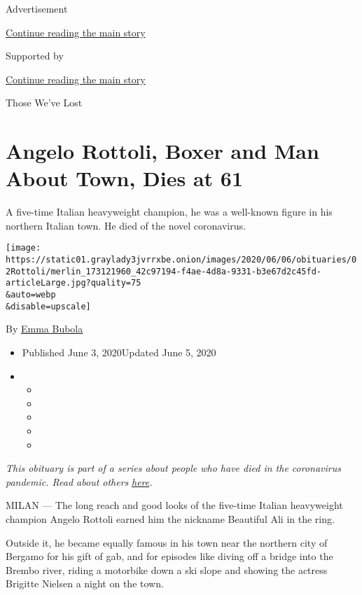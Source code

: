 Advertisement

\protect\hyperlink{after-top}{Continue reading the main story}

Supported by

\protect\hyperlink{after-sponsor}{Continue reading the main story}

Those We've Lost

\hypertarget{angelo-rottoli-boxer-and-man-about-town-dies-at-61}{%
\section{Angelo Rottoli, Boxer and Man About Town, Dies at
61}\label{angelo-rottoli-boxer-and-man-about-town-dies-at-61}}

A five-time Italian heavyweight champion, he was a well-known figure in
his northern Italian town. He died of the novel coronavirus.

\texttt{[image: https://static01.graylady3jvrrxbe.onion/images/2020/06/06/obituaries/02Rottoli/merlin\_173121960\_42c97194-f4ae-4d8a-9331-b3e67d2c45fd-articleLarge.jpg?quality=75\\\&auto=webp\\\&disable=upscale]}

By \href{https://www.nytimes3xbfgragh.onion/by/emma-bubola}{Emma Bubola}

\begin{itemize}
\item
  Published June 3, 2020Updated June 5, 2020
\item
  \begin{itemize}
  \item
  \item
  \item
  \item
  \item
  \end{itemize}
\end{itemize}

\emph{This obituary is part of a series about people who have died in
the coronavirus pandemic. Read about others}
\href{https://www.nytimes3xbfgragh.onion/interactive/2020/obituaries/people-died-coronavirus-obituaries.html}{\emph{here}}\emph{.}

MILAN --- The long reach and good looks of the five-time Italian
heavyweight champion Angelo Rottoli earned him the nickname Beautiful
Ali in the ring.

Outside it, he became equally famous in his town near the northern city
of Bergamo for his gift of gab, and for episodes like diving off a
bridge into the Brembo river, riding a motorbike down a ski slope and
showing the actress Brigitte Nielsen a night on the town.

